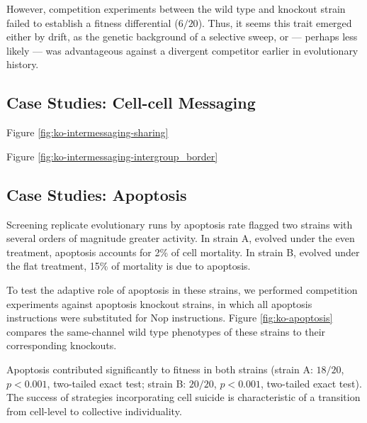 However, competition experiments between the wild type and knockout strain failed to establish a fitness differential ($6/20$).
Thus, it seems this trait emerged either by drift, as the genetic background of a selective sweep, or --- perhaps less likely --- was advantageous against a divergent competitor earlier in evolutionary history.

\subsection{Case Studies: Cell-cell Messaging} \label{sec:cell-cell-messaging}





Figure \ref{fig:ko-intermessaging-sharing}

Figure \ref{fig:ko-intermessaging-intergroup_border}

\subsection{Case Studies: Apoptosis} \label{sec:apoptosis}



Screening replicate evolutionary runs by apoptosis rate flagged two strains with several orders of magnitude greater activity.
In strain A, evolved under the even treatment, apoptosis accounts for 2\% of cell mortality.
In strain B, evolved under the flat treatment, 15\% of mortality is due to apoptosis.

To test the adaptive role of apoptosis in these strains, we performed competition experiments against apoptosis knockout strains, in which all apoptosis instructions were substituted for Nop instructions.
Figure \ref{fig:ko-apoptosis} compares the same-channel wild type phenotypes of these strains to their corresponding knockouts.

Apoptosis contributed significantly to fitness in both strains (strain A: $18/20$, $p < 0.001$, two-tailed exact test; strain B: $20/20$, $p < 0.001$, two-tailed exact test).
The success of strategies incorporating cell suicide is characteristic of a transition from cell-level to collective individuality.
